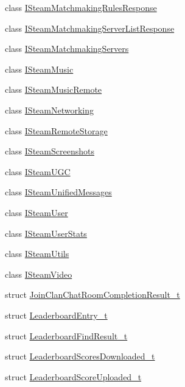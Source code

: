 \begin{DoxyCompactItemize}
class \hyperlink{classValve_1_1Steamworks_1_1ISteamMatchmakingRulesResponse}{I\+Steam\+Matchmaking\+Rules\+Response}
\item 
class \hyperlink{classValve_1_1Steamworks_1_1ISteamMatchmakingServerListResponse}{I\+Steam\+Matchmaking\+Server\+List\+Response}
\item 
class \hyperlink{classValve_1_1Steamworks_1_1ISteamMatchmakingServers}{I\+Steam\+Matchmaking\+Servers}
\item 
class \hyperlink{classValve_1_1Steamworks_1_1ISteamMusic}{I\+Steam\+Music}
\item 
class \hyperlink{classValve_1_1Steamworks_1_1ISteamMusicRemote}{I\+Steam\+Music\+Remote}
\item 
class \hyperlink{classValve_1_1Steamworks_1_1ISteamNetworking}{I\+Steam\+Networking}
\item 
class \hyperlink{classValve_1_1Steamworks_1_1ISteamRemoteStorage}{I\+Steam\+Remote\+Storage}
\item 
class \hyperlink{classValve_1_1Steamworks_1_1ISteamScreenshots}{I\+Steam\+Screenshots}
\item 
class \hyperlink{classValve_1_1Steamworks_1_1ISteamUGC}{I\+Steam\+U\+G\+C}
\item 
class \hyperlink{classValve_1_1Steamworks_1_1ISteamUnifiedMessages}{I\+Steam\+Unified\+Messages}
\item 
class \hyperlink{classValve_1_1Steamworks_1_1ISteamUser}{I\+Steam\+User}
\item 
class \hyperlink{classValve_1_1Steamworks_1_1ISteamUserStats}{I\+Steam\+User\+Stats}
\item 
class \hyperlink{classValve_1_1Steamworks_1_1ISteamUtils}{I\+Steam\+Utils}
\item 
class \hyperlink{classValve_1_1Steamworks_1_1ISteamVideo}{I\+Steam\+Video}
\item 
struct \hyperlink{structValve_1_1Steamworks_1_1JoinClanChatRoomCompletionResult__t}{Join\+Clan\+Chat\+Room\+Completion\+Result\+\_\+t}
\item 
struct \hyperlink{structValve_1_1Steamworks_1_1LeaderboardEntry__t}{Leaderboard\+Entry\+\_\+t}
\item 
struct \hyperlink{structValve_1_1Steamworks_1_1LeaderboardFindResult__t}{Leaderboard\+Find\+Result\+\_\+t}
\item 
struct \hyperlink{structValve_1_1Steamworks_1_1LeaderboardScoresDownloaded__t}{Leaderboard\+Scores\+Downloaded\+\_\+t}
\item 
struct \hyperlink{structValve_1_1Steamworks_1_1LeaderboardScoreUploaded__t}{Leaderboard\+Score\+Uploaded\+\_\+t}

\end{DoxyCompactItemize}
